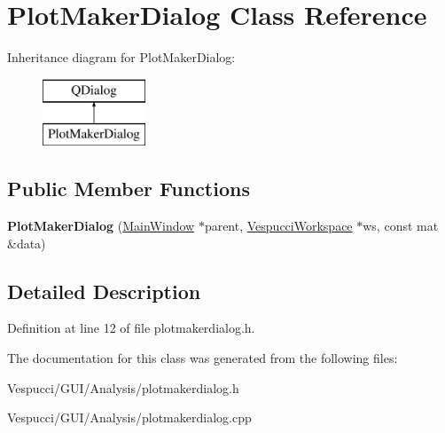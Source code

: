 \hypertarget{class_plot_maker_dialog}{}\section{Plot\+Maker\+Dialog Class Reference}
\label{class_plot_maker_dialog}
Inheritance diagram for Plot\+Maker\+Dialog\+:\begin{figure}[H]
\begin{center}
\leavevmode
\includegraphics[height=2.000000cm]{class_plot_maker_dialog}
\end{center}
\end{figure}
\subsection*{Public Member Functions}
\begin{DoxyCompactItemize}
\item 
{\bfseries Plot\+Maker\+Dialog} (\hyperlink{class_main_window}{Main\+Window} $\ast$parent, \hyperlink{class_vespucci_workspace}{Vespucci\+Workspace} $\ast$ws, const mat \&data)\hypertarget{class_plot_maker_dialog_a36e9c9708194ed95cc759b9f58b0921d}{}\label{class_plot_maker_dialog_a36e9c9708194ed95cc759b9f58b0921d}

\end{DoxyCompactItemize}


\subsection{Detailed Description}


Definition at line 12 of file plotmakerdialog.\+h.



The documentation for this class was generated from the following files\+:\begin{DoxyCompactItemize}
\item 
Vespucci/\+G\+U\+I/\+Analysis/plotmakerdialog.\+h\item 
Vespucci/\+G\+U\+I/\+Analysis/plotmakerdialog.\+cpp\end{DoxyCompactItemize}
